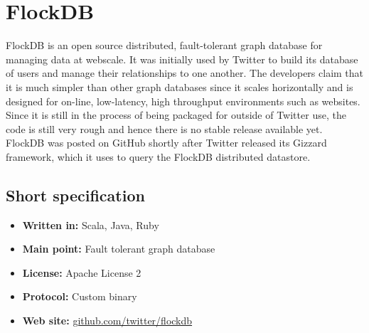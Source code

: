 \chapter{FlockDB}

FlockDB is an open source distributed, fault-tolerant graph database for managing data at webscale. It was initially used by Twitter to build its database of users and manage their relationships to one another. The developers claim that it is much simpler than other graph databases since it scales horizontally and is designed for on-line, low-latency, high throughput environments such as websites. Since it is still in the process of being packaged for outside of Twitter use, the code is still very rough and hence there is no stable release available yet. FlockDB was posted on GitHub shortly after Twitter released its Gizzard framework, which it uses to query the FlockDB distributed datastore. 

\section{Short specification}

\begin{itemize}
  \item \textbf{Written in:} Scala, Java, Ruby
  \item \textbf{Main point:} Fault tolerant graph database
  \item \textbf{License:} Apache License 2
  \item \textbf{Protocol:} Custom binary
  \item \textbf{Web site:} \href{https://github.com/twitter/flockdb}{github.com/twitter/flockdb}
\end{itemize}